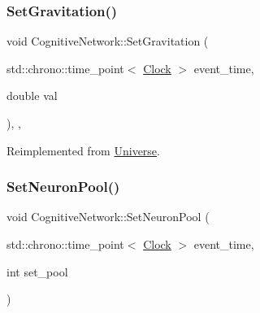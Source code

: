 \mbox{\label{classCognitiveNetwork_af9f082a70f0cc25a3f818d9eace5a527}} 
\subsubsection{\texorpdfstring{Set\+Gravitation()}{SetGravitation()}}
{\footnotesize\ttfamily void Cognitive\+Network\+::\+Set\+Gravitation (\begin{DoxyParamCaption}\item[{std\+::chrono\+::time\+\_\+point$<$ \mbox{\hyperlink{universe_8h_a0ef8d951d1ca5ab3cfaf7ab4c7a6fd80}{Clock}} $>$}]{event\+\_\+time,  }\item[{double}]{val }\end{DoxyParamCaption})\hspace{0.3cm}{\ttfamily [inline]}, {\ttfamily [final]}, {\ttfamily [virtual]}}



Reimplemented from \mbox{\hyperlink{classUniverse_ae0cb8d86b2fbb8396d605160344b42f5}{Universe}}.

\mbox{\label{classCognitiveNetwork_a2e1137387c4165dd3f91a758d2ce7f34}} 
\subsubsection{\texorpdfstring{Set\+Neuron\+Pool()}{SetNeuronPool()}}
{\footnotesize\ttfamily void Cognitive\+Network\+::\+Set\+Neuron\+Pool (\begin{DoxyParamCaption}\item[{std\+::chrono\+::time\+\_\+point$<$ \mbox{\hyperlink{universe_8h_a0ef8d951d1ca5ab3cfaf7ab4c7a6fd80}{Clock}} $>$}]{event\+\_\+time,  }\item[{int}]{set\+\_\+pool }\end{DoxyParamCaption})\hspace{0.3cm}{\ttfamily [inline]}}

\mbox{\label{classCognitiveNetwork_a84f808251f67ced0edad2e1dd4d47039}} 
